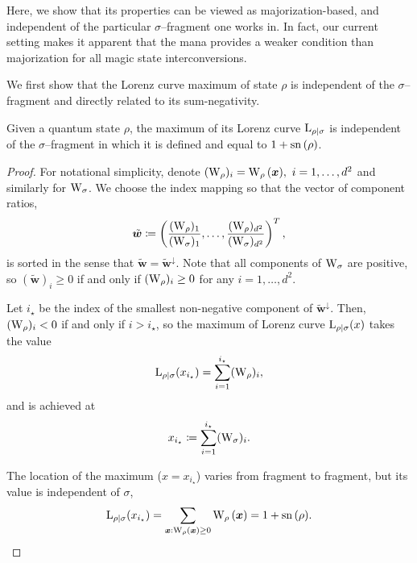 \documentclass[pra,
aps,
twocolumn,
superscriptaddress,
groupedaddress,
nofootinbib,
reprint
]{revtex4-1}
\begin{document}
Here, we show that its properties can be viewed as majorization-based, and independent of the particular $\sigma$--fragment one works in.
In fact, our current setting makes it apparent that the mana provides a weaker condition than majorization for all magic state interconversions.

We first show that the Lorenz curve maximum of state $\rho$ is independent of the $\sigma$--fragment and directly related to its sum-negativity.
\begin{lemma}\label{lem:lcmax}
	Given a quantum state $\rho$, the maximum of its Lorenz curve ${{\rm{L}}_{\rho|\sigma}}$ is independent of the $\sigma$--fragment in which it is defined and equal to $1+{{\rm{sn}}\left(\rho\right)}$.
\end{lemma}
\begin{proof}
	For notational simplicity, denote $(\W{\rho})_i = \W[\bmx]{\rho},\ i = 1,\dots, d^2$ and similarly for $\W{\sigma}$.
	We choose the index mapping so that the vector of component ratios, 
	\begin{equation}
		\tilde{\bm{w}} \coloneqq \left(\frac{(\W{\rho})_1}{(\W{\sigma})_1}, \dots, \frac{(\W{\rho})_{d^2}}{(\W{\sigma})_{d^2}} \right)^T,
	\end{equation}
	is sorted in the sense that $\tilde{\bm{w}} = \tilde{\bm{w}}^\downarrow$.
	Note that all components of $\W{\sigma}$ are positive, so $(\tilde{\bm{w}})_i \geq 0$ if and only if $(\W{\rho})_i \geq 0$ for any $i=1,\dots,d^2$.
	
	Let $i_\star$ be the index of the smallest non-negative component of $\tilde{\bm{w}}^\downarrow$.
	Then, $(\W{\rho})_i < 0$ if and only if $i > i_\star$, so the maximum of Lorenz curve ${{\rm{L}}_{\rho|\sigma}}(x)$ takes the value 
	\begin{equation}
		\lc{\rho}{\sigma}(x_{i_\star}) = \sum_{i=1}^{i_\star} (\W{\rho})_i,
	\end{equation}
	and is achieved at
	\begin{equation}\label{eq:maxloc}
		x_{i_\star} \coloneqq \sum_{i=1}^{i_\star} (\W{\sigma})_i.
	\end{equation}

	The location of the maximum ($x=x_{i_\star}$) varies from fragment to fragment, but its value is independent of $\sigma$,
	\begin{equation}
		\lc{\rho}{\sigma}(x_{i_\star})
		= \sum\limits_{\bmx: \W[\bmx]{\rho} \geq 0} \W[\bmx]{\rho}
		= 1 + \sn{\rho}.
	\end{equation}
	
\end{proof}
\end{document}
